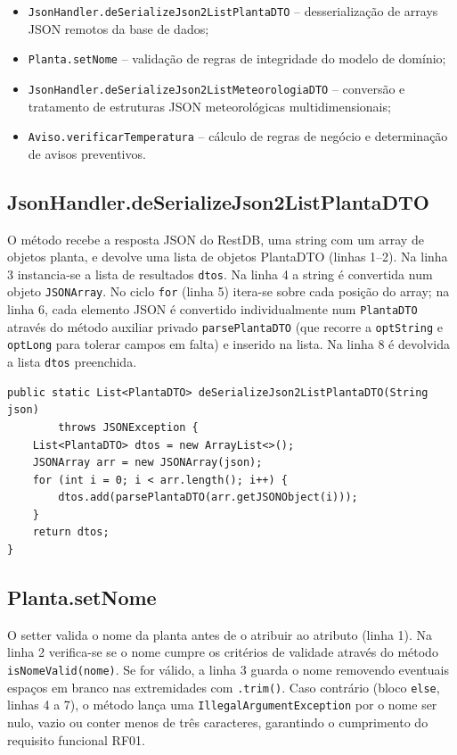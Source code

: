\documentclass[runningheads,a4paper]{llncs}
\begin{document}
\begin{itemize}
  \item \texttt{JsonHandler.deSerializeJson2ListPlantaDTO} -- desserialização de arrays JSON remotos da base de dados;
  \item \texttt{Planta.setNome} -- validação de regras de integridade do modelo de domínio;
  \item \texttt{JsonHandler.deSerializeJson2ListMeteorologiaDTO} -- conversão e tratamento de estruturas JSON meteorológicas multidimensionais;
  \item \texttt{Aviso.verificarTemperatura} -- cálculo de regras de negócio e determinação de avisos preventivos.
\end{itemize}

\subsection{JsonHandler.deSerializeJson2ListPlantaDTO}
O método recebe a resposta JSON do RestDB, uma string com um array de objetos
planta, e devolve uma lista de objetos PlantaDTO (linhas 1--2). Na linha 3
instancia-se a lista de resultados \texttt{dtos}. Na linha 4 a string é
convertida num objeto \texttt{JSONArray}. No ciclo \texttt{for} (linha 5)
itera-se sobre cada posição do array; na linha 6, cada elemento JSON é
convertido individualmente num \texttt{PlantaDTO} através do método auxiliar
privado \texttt{parsePlantaDTO} (que recorre a \texttt{optString} e
\texttt{optLong} para tolerar campos em falta) e inserido na lista. Na linha 8
é devolvida a lista \texttt{dtos} preenchida.

\begin{lstlisting}[caption={JsonHandler.deSerializeJson2ListPlantaDTO},label=lst:deserplanta]
public static List<PlantaDTO> deSerializeJson2ListPlantaDTO(String json)
        throws JSONException {
    List<PlantaDTO> dtos = new ArrayList<>();
    JSONArray arr = new JSONArray(json);
    for (int i = 0; i < arr.length(); i++) {
        dtos.add(parsePlantaDTO(arr.getJSONObject(i)));
    }
    return dtos;
}
\end{lstlisting}

\subsection{Planta.setNome}
O setter valida o nome da planta antes de o atribuir ao atributo (linha 1). Na
linha 2 verifica-se se o nome cumpre os critérios de validade através do método
\texttt{isNomeValid(nome)}. Se for válido, a linha 3 guarda o nome removendo
eventuais espaços em branco nas extremidades com \texttt{.trim()}. Caso
contrário (bloco \texttt{else}, linhas 4 a 7), o método lança uma
\texttt{IllegalArgumentException} por o nome ser nulo, vazio ou conter menos de
três caracteres, garantindo o cumprimento do requisito funcional RF01.
\end{document}
